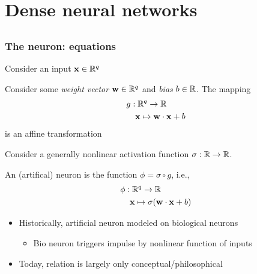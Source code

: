 \section[Dense NNs]{Dense neural networks}

\subsection{}

\begin{frame}
    \frametitle{The neuron: equations}

    Consider an input $\mathbf{x} \in \mathbb{R}^q$
    \begin{block}{}
        Consider some \emph{weight vector} $\mathbf{w} \in \mathbb{R}^q$ and \emph{bias} $b \in \mathbb{R}$.
        The mapping
        \begin{align*}
            g &: \mathbb{R}^q \to \mathbb{R} \\
            &\hspace{1.25ex} \mathbf{x} \mapsto \mathbf{w} \cdot \mathbf{x} + b
        \end{align*}
        is an \alert{affine transformation}
    \end{block}
    \pause

    Consider a generally nonlinear \alert{activation function} $\sigma: \mathbb{R} \to \mathbb{R}$.

    \begin{block}{}
        An (artifical) \alert{neuron} is the function $\phi = \sigma \circ g$, i.e.,
        \begin{align*}
            \phi &: \mathbb{R}^q \to \mathbb{R} \\
            &\hspace{1.25ex} \mathbf{x} \mapsto \sigma(\mathbf{w} \cdot \mathbf{x} + b)
        \end{align*}
    \end{block}
    \pause

    \begin{itemize}
        \item Historically, artificial neuron modeled on biological neurons
        \begin{itemize}
            \item Bio neuron triggers impulse by nonlinear function of inputs
        \end{itemize}
        \item Today, relation is largely only conceptual/philosophical
    \end{itemize}
\end{frame}

